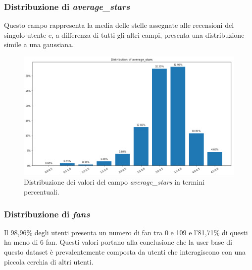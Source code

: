 \documentclass[12pt]{article}
\begin{document}
\subsubsection{Distribuzione di \textit{average\_stars}}
Questo campo rappresenta la media delle stelle assegnate alle recensioni del singolo utente e, a differenza di tutti gli altri campi, presenta una distribuzione simile a una gaussiana.
\begin{figure}[h]
\centering
\includegraphics[width=\textwidth]{images/average_stars_distribution.png}
\caption{Distribuzione dei valori del campo \textit{average\_stars} in termini percentuali.}
\end{figure}

\subsubsection{Distribuzione di \textit{fans}}
Il 98,96\% degli utenti presenta un numero di fan tra 0 e 109 e l'81,71\% di questi ha meno di 6 fan. Questi valori portano alla conclusione che la user base di questo dataset è prevalentemente composta da utenti che interagiscono con una piccola cerchia di altri utenti.
\end{document}
